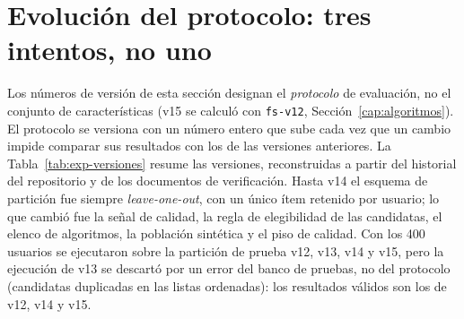 \section{Evolución del protocolo: tres intentos, no uno}\label{sec:exp-evolucion}\label{sec:exp-v15-fidelidad}

Los números de versión de esta sección designan el \emph{protocolo} de evaluación, no el conjunto de
características (v15 se calculó con \texttt{fs-v12}, Sección~\ref{cap:algoritmos}). El protocolo se versiona con un
número entero que sube cada vez que un cambio impide comparar sus resultados con los
de las versiones anteriores. La Tabla~\ref{tab:exp-versiones} resume las versiones, reconstruidas a partir del
historial del repositorio y de los documentos de verificación. Hasta v14 el esquema de partición fue siempre
\emph{leave-one-out}, con un único ítem retenido por usuario; lo que cambió fue la señal de calidad, la regla de
elegibilidad de las candidatas, el elenco de algoritmos, la población sintética y el piso de calidad. Con los 400
usuarios se ejecutaron sobre la partición de prueba v12, v13, v14 y v15, pero la ejecución de v13 se descartó por un
error del banco de pruebas, no del protocolo (candidatas duplicadas en las listas ordenadas): los resultados válidos
son los de v12, v14 y v15.


